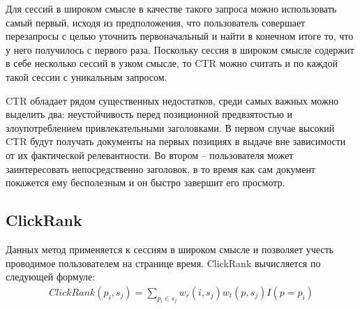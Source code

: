 \documentclass[diploma]{nanolab2015}
\begin{document}
Для сессий в широком смысле в качестве такого запроса можно использовать самый первый, исходя из предположения, что пользователь совершает перезапросы с целью уточнить первоначальный и найти в конечном итоге то, что у него получилось с первого раза. Поскольку сессия в широком смысле содержит в себе несколько сессий в узком смысле, то CTR можно считать и по каждой такой сессии с уникальным запросом.

CTR обладает рядом существенных недостатков, среди самых важных можно выделить два: неустойчивость перед позиционной предвзятостью и злоупотреблением привлекательными заголовками. В первом случае высокий CTR будут получать документы на первых позициях в выдаче вне зависимости от их фактической релевантности. Во втором -- пользователя может заинтересовать непосредственно заголовок, в то время как сам документ покажется ему бесполезным и он быстро завершит его просмотр.

\subsection{ClickRank}
Данных метод применяется к сессиям в широком смысле и позволяет учесть проводимое пользователем на странице время. ClickRank \cite{clickrank} вычисляется по следующей формуле:
\begin{align}
    ClickRank(p_i, s_j) = \sum_{p_i \in s_j} w_r(i, s_j) w_t(p, s_j) I(p=p_i)
\end{align}
\end{document}
